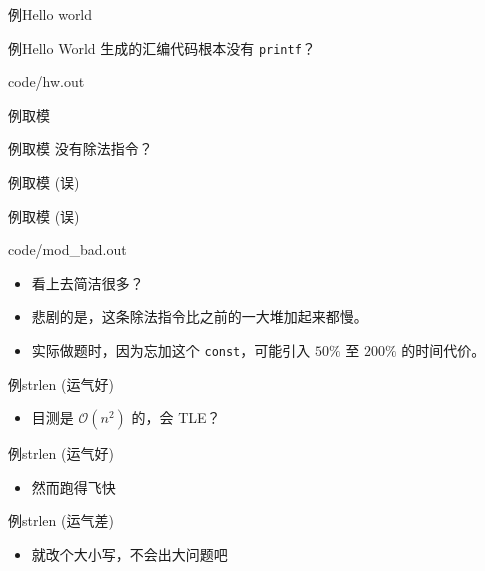 \documentclass[10pt,mathserif]{beamer}
\newcommand{\lstcode}[1] {  }
\newcommand{\lstterm}[1] {  }
\begin{document}
\begin{frame}[fragile]{例}{Hello world}
	\lstcode{hw.cc}
\end{frame}

\begin{frame}[fragile]{例}{Hello World}
	生成的汇编代码根本没有 \texttt{printf}？
	
	{code/hw.out}
\end{frame}

\begin{frame}[fragile]{例}{取模}
	\lstcode{mod.cc}
\end{frame}

\begin{frame}[fragile]{例}{取模}
	没有除法指令？
	\lstterm{mod.out}
\end{frame}

\begin{frame}[fragile]{例}{取模 (误)}
	\lstcode{mod_bad.cc}
\end{frame}

\begin{frame}[fragile]{例}{取模 (误)}
	
	{code/mod_bad.out}
	\begin{itemize}
		\item 看上去简洁很多？
		\item 悲剧的是，这条除法指令比之前的一大堆加起来都慢。
		\item 实际做题时，因为忘加这个 \texttt{const}，可能引入
			$50\%$ 至 $200\%$ 的时间代价。
	\end{itemize}
\end{frame}

\begin{frame}[fragile]{例}{strlen (运气好)}
	\lstcode{strlen-1.cc}
	\begin{itemize}
		\item 目测是 $\mathcal{O}(n^2)$ 的，会 TLE？
	\end{itemize}
\end{frame}

\begin{frame}[fragile]{例}{strlen (运气好)}
	\lstterm{strlen-1.out}
	\begin{itemize}
		\item 然而跑得飞快
	\end{itemize}
\end{frame}

\begin{frame}[fragile]{例}{strlen (运气差)}
	\lstcode{strlen-2.cc}
	\begin{itemize}
		\item 就改个大小写，不会出大问题吧
	\end{itemize}
\end{frame}
\end{document}
